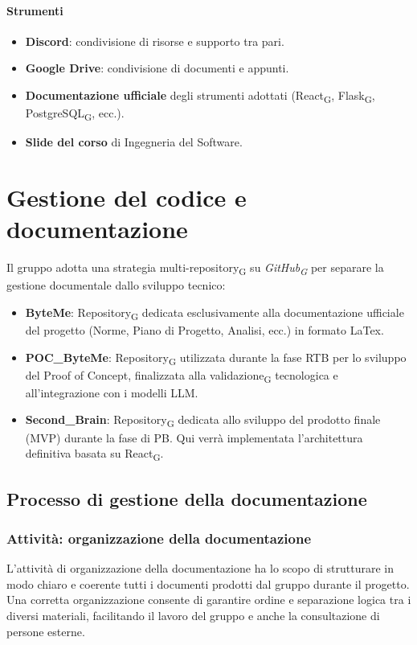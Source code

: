 \documentclass[11pt,a4paper]{article}
\newcommand{\gls}[1]{#1\textsubscript{G}}
\begin{document}
\paragraph{Strumenti}
\begin{itemize}
    \item \textbf{Discord}: condivisione di risorse e supporto tra pari.
    \item \textbf{Google Drive}: condivisione di documenti e appunti.
    \item \textbf{Documentazione ufficiale} degli strumenti adottati
    (\gls{React}, \gls{Flask}, \gls{PostgreSQL}, ecc.).
    \item \textbf{Slide del corso} di Ingegneria del Software.
\end{itemize}


\newpage

\section{Gestione del codice e documentazione}
Il gruppo adotta una strategia multi-\gls{repository} su \textit{\gls{GitHub}} per separare la gestione documentale dallo sviluppo tecnico:
\begin{itemize}
    \item \textbf{ByteMe}: \gls{Repository} dedicata esclusivamente alla documentazione ufficiale del progetto (Norme, Piano di Progetto, Analisi, ecc.) in formato LaTex.
    \item \textbf{POC\_ByteMe}: \gls{Repository} utilizzata durante la fase RTB per lo sviluppo del Proof of Concept, finalizzata alla \gls{validazione} tecnologica e all'integrazione con i modelli LLM.
    \item \textbf{Second\_Brain}: \gls{Repository} dedicata allo sviluppo del prodotto finale (MVP) durante la fase di PB. Qui verrà implementata l'architettura definitiva basata su \gls{React}.
\end{itemize}

\subsection{Processo di gestione della documentazione}

\subsubsection{Attività: organizzazione della documentazione}
L’attività di organizzazione della documentazione ha lo scopo di strutturare in modo chiaro e coerente tutti i documenti prodotti dal gruppo durante il progetto.
Una corretta organizzazione consente di garantire ordine e separazione logica tra i diversi materiali, facilitando il lavoro del gruppo e anche la consultazione di persone esterne.
\end{document}
